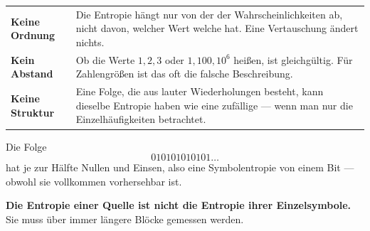 \begin{warnung}
\begin{center}
{\small
\renewcommand{\arraystretch}{1.52}
\begin{tabular}{@{}P{2.4cm}P{6.2cm}@{}}
\toprule
\textbf{Keine Ordnung} & Die Entropie hängt nur von der  der Wahrscheinlichkeiten ab, nicht davon, welcher Wert welche hat. Eine Vertauschung ändert nichts.\\
\textbf{Kein Abstand} & Ob die Werte $1,2,3$ oder $1, 100, 10^6$ heißen, ist gleichgültig. Für Zahlengrößen ist das oft die falsche Beschreibung.\\
\textbf{Keine Struktur} & Eine Folge, die aus lauter Wiederholungen besteht, kann dieselbe Entropie haben wie eine zufällige --- wenn man nur die Einzelhäufigkeiten betrachtet.\\
\bottomrule
\end{tabular}}
\end{center}

Die Folge
\[ 010101010101\ldots \]
hat je zur Hälfte Nullen und Einsen, also eine Symbolentropie von einem Bit --- obwohl sie vollkommen vorhersehbar ist.

\begin{center}
\begin{minipage}{0.9\textwidth}
\textbf{Die Entropie einer Quelle ist nicht die Entropie ihrer Einzelsymbole.} Sie muss über immer längere Blöcke gemessen werden.
\end{minipage}
\end{center}

\begin{center}
\begin{minipage}{0.88\textwidth}
\end{minipage}
\end{center}
\end{warnung}

